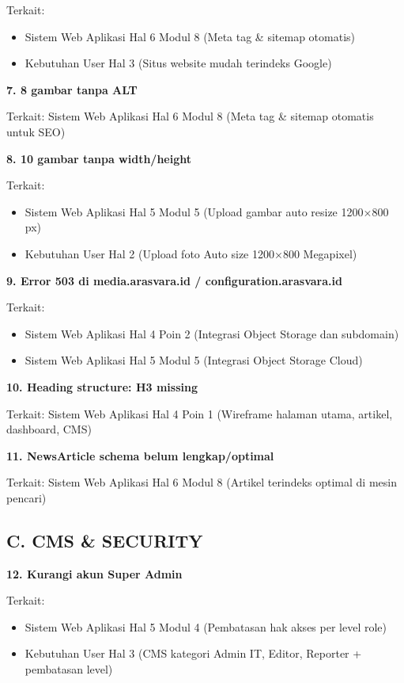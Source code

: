 \documentclass[12pt,a4paper]{article}
\begin{document}
Terkait:
\begin{itemize}[topsep=0pt, partopsep=0pt, itemsep=2pt]
    \item Sistem Web Aplikasi Hal 6 Modul 8 (Meta tag \& sitemap otomatis)
    \item Kebutuhan User Hal 3 (Situs website mudah terindeks Google)
\end{itemize}

\textbf{7. 8 gambar tanpa ALT}

Terkait: Sistem Web Aplikasi Hal 6 Modul 8 (Meta tag \& sitemap otomatis untuk SEO)

\textbf{8. 10 gambar tanpa width/height}

Terkait:
\begin{itemize}[topsep=0pt, partopsep=0pt, itemsep=2pt]
    \item Sistem Web Aplikasi Hal 5 Modul 5 (Upload gambar auto resize 1200×800 px)
    \item Kebutuhan User Hal 2 (Upload foto Auto size 1200×800 Megapixel)
\end{itemize}

\textbf{9. Error 503 di media.arasvara.id / configuration.arasvara.id}

Terkait:
\begin{itemize}[topsep=0pt, partopsep=0pt, itemsep=2pt]
    \item Sistem Web Aplikasi Hal 4 Poin 2 (Integrasi Object Storage dan subdomain)
    \item Sistem Web Aplikasi Hal 5 Modul 5 (Integrasi Object Storage Cloud)
\end{itemize}

\textbf{10. Heading structure: H3 missing}

Terkait: Sistem Web Aplikasi Hal 4 Poin 1 (Wireframe halaman utama, artikel, dashboard, CMS)

\textbf{11. NewsArticle schema belum lengkap/optimal}

Terkait: Sistem Web Aplikasi Hal 6 Modul 8 (Artikel terindeks optimal di mesin pencari)

\subsection*{C. CMS \& SECURITY}

\textbf{12. Kurangi akun Super Admin}

Terkait:
\begin{itemize}[topsep=0pt, partopsep=0pt, itemsep=2pt]
    \item Sistem Web Aplikasi Hal 5 Modul 4 (Pembatasan hak akses per level role)
    \item Kebutuhan User Hal 3 (CMS kategori Admin IT, Editor, Reporter + pembatasan level)
\end{itemize}
\end{document}
